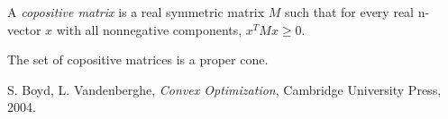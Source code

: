 \documentclass[12pt]{article}
\begin{document}
A \emph{copositive matrix} is a real symmetric matrix $M$ such that for every real n-vector $x$ with all nonnegative components, $x^TMx\ge 0$.
\par\bigskip
The set of copositive matrices is a proper cone.
\par\bigskip
\begin{thebibliography}{4}
 S. Boyd, L. Vandenberghe, \emph{Convex Optimization}, Cambridge University Press, 2004.
\end{thebibliography}
\end{document}
